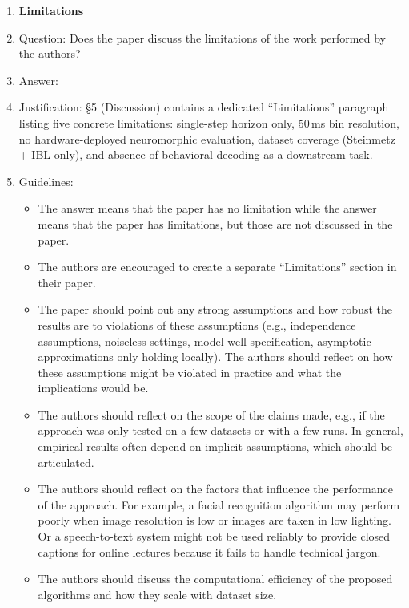 \begin{enumerate}
\item {\bf Limitations}
    \item[] Question: Does the paper discuss the limitations of the work performed by the authors?
    \item[] Answer: \answerYes{}
    \item[] Justification: \S5 (Discussion) contains a dedicated
      ``Limitations'' paragraph listing five concrete limitations:
      single-step horizon only, 50\,ms bin resolution, no
      hardware-deployed neuromorphic evaluation, dataset coverage
      (Steinmetz + IBL only), and absence of behavioral decoding as a
      downstream task.
    \item[] Guidelines:
    \begin{itemize}
        \item The answer \answerNA{} means that the paper has no limitation while the answer \answerNo{} means that the paper has limitations, but those are not discussed in the paper. 
        \item The authors are encouraged to create a separate ``Limitations'' section in their paper.
        \item The paper should point out any strong assumptions and how robust the results are to violations of these assumptions (e.g., independence assumptions, noiseless settings, model well-specification, asymptotic approximations only holding locally). The authors should reflect on how these assumptions might be violated in practice and what the implications would be.
        \item The authors should reflect on the scope of the claims made, e.g., if the approach was only tested on a few datasets or with a few runs. In general, empirical results often depend on implicit assumptions, which should be articulated.
        \item The authors should reflect on the factors that influence the performance of the approach. For example, a facial recognition algorithm may perform poorly when image resolution is low or images are taken in low lighting. Or a speech-to-text system might not be used reliably to provide closed captions for online lectures because it fails to handle technical jargon.
        \item The authors should discuss the computational efficiency of the proposed algorithms and how they scale with dataset size.

\end{itemize}
\end{enumerate}
